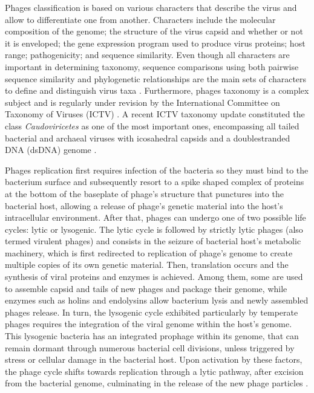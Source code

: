 \documentclass[runningheads]{llncs}
\begin{document}
Phages classification is based on various characters that describe the virus and allow to differentiate one from another. Characters include the molecular composition of the genome; the structure of the virus capsid and whether or not it is enveloped; the gene expression program used to produce virus proteins; host range; pathogenicity; and sequence similarity. Even though all characters are important in determining taxonomy, sequence comparisons using both pairwise sequence similarity and phylogenetic relationships are the main sets of characters to define and distinguish virus taxa \cite{Lefkowitz2018}.
Furthermore, phages taxonomy is a complex subject and is regularly under revision by the International Committee on Taxonomy of Viruses (ICTV) \cite{Walker2022}. A recent ICTV taxonomy update constituted the class \textit{Caudoviricetes} as one of the most important ones, encompassing all tailed bacterial and archaeal viruses with icosahedral capsids and a doublestranded DNA (dsDNA) genome \cite{Turner2023}.

Phages replication first requires infection of the bacteria so they must bind to the bacterium surface and subsequently resort to a spike shaped complex of proteins at the bottom of the baseplate of phage's structure that punctures into the bacterial host, allowing a release of phage's genetic material into the host's intracellular environment.
After that, phages can undergo one of two possible life cycles: lytic or lysogenic. 
The lytic cycle is followed by strictly lytic phages (also termed virulent phages) and consists in the seizure of bacterial host's metabolic machinery, which is first redirected to replication of phage's genome to create multiple copies of its own genetic material. Then, translation occurs and the synthesis of viral proteins and enzymes is achieved. Among them, some are used to assemble capsid and tails of new phages and package their genome, while enzymes such as holins and endolysins allow bacterium lysis and newly assembled phages release.
In turn, the lysogenic cycle exhibited particularly by temperate phages requires the integration of the viral genome within the host's genome. This lysogenic bacteria has an integrated prophage within its genome, that can remain dormant through numerous bacterial cell divisions, unless triggered by stress or cellular damage in the bacterial host. Upon activation by these factors, the phage cycle shifts towards replication through a lytic pathway, after excision from the bacterial genome, culminating in the release of the new phage particles \cite{Harada2018} \cite{Sharma2017}. 
\end{document}
